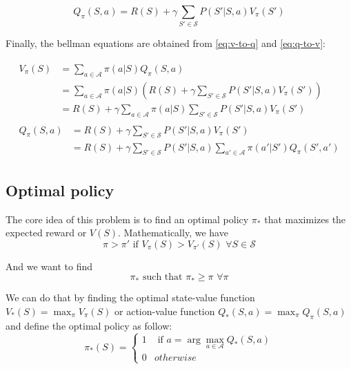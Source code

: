 \documentclass[
  a4paper, xcolor = usenames,dvipsnames]{article}
\begin{document}
\begin{equation}
Q_{\pi}(S, a) = R(S) + \gamma \sum_{S' \in \mathcal{S}} P(S' | S, a) V_{\pi}(S')
\label{eq:q-to-v}
\end{equation}

Finally, the bellman equations are obtained from \eqref{eq:v-to-q} and \eqref{eq:q-to-v}:

\begin{align}
\begin{split}
V_{\pi}(S) {}&= \sum_{a \in \mathcal{A}} \pi(a | S) Q_{\pi}(S, a) \\
  &= \sum_{a \in \mathcal{A}} \pi(a | S) (R(S) + \gamma \sum_{S' \in \mathcal{S}} P(S' | S, a) V_{\pi}(S')) \\
  &= R(S) + \gamma \sum_{a \in \mathcal{A}} \pi(a | S) \sum_{S' \in \mathcal{S}} P(S' | S, a) V_{\pi}(S')
\label{eq:bellman-v-1}
\end{split} \\
\begin{split}
Q_{\pi}(S, a) {}&= R(S) + \gamma \sum_{S' \in \mathcal{S}} P(S' | S, a) V_{\pi}(S') \\
  &= R(S) + \gamma \sum_{S' \in \mathcal{S}} P(S' | S, a) \sum_{a' \in \mathcal{A}} \pi(a' | S') Q_{\pi}(S', a')
\label{eq:bellman-q-1}
\end{split}
\end{align}

\hypertarget{optimal-policy}{%
\subsection{Optimal policy}\label{optimal-policy}}

The core idea of this problem is to find an optimal policy \(\pi_{*}\) that maximizes the expected reward or \(V(S)\). Mathematically, we have
\[
\pi > \pi' \text{ if } V_{\pi}(S) > V_{\pi'}(S) \,\, \forall S \in \mathcal{S}
\]

And we want to find
\[
\pi_{*} \text{ such that } \pi_{*} \ge \pi \,\, \forall \pi
\]

We can do that by finding the optimal state-value function \(V_{*}(S) = \max_{\pi} V_{\pi}(S)\) or action-value function \(Q_{*}(S, a) = \max_{\pi} Q_{\pi}(S, a)\) and define the optimal policy as follow:
\[
\pi_{*}(S) = \begin{cases}
1 & \text{ if } a = \arg\max_{a \in \mathcal{A}} Q_{*}(S, a) \\
0 & otherwise
\end{cases}
\]
\end{document}

